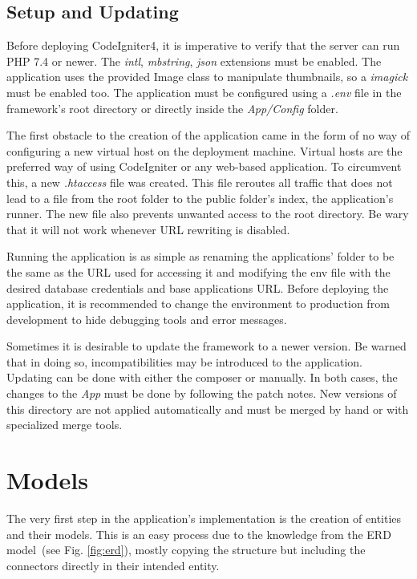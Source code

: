 \documentclass[
  digital,     %
  oneside,     %
  nosansbold,  %
  colorbold, %
  lof,         %
  lot,         %
]{fithesis4}
\newcommand{\imgref}[1]{(see Fig. \ref{fig:#1})}
\begin{document}
\subsection{Setup and Updating}


Before deploying CodeIgniter4, it is imperative to verify that the server can run PHP 7.4 or newer. The
\textit{intl}, \textit{mbstring}, \textit{json} extensions must be enabled. The application uses the
provided Image class to manipulate thumbnails, so a \textit{imagick} must be enabled too. The
application must be configured using a \textit{.env} file in the framework's root directory or directly
inside the \textit{App/Config} folder.

The first obstacle to the creation of the application came in the form of no way of configuring a new
virtual host on the deployment machine. Virtual hosts are the preferred way of using CodeIgniter or
any web-based application. To circumvent this, a new \textit{.htaccess} file was created. This file
reroutes all traffic that does not lead to a file from the root folder to the public folder's index, the
application's runner. The new file also prevents unwanted access to the root directory. Be wary that it
will not work whenever URL rewriting is disabled.

Running the application is as simple as renaming the applications' folder to be the same as the URL
used for accessing it and modifying the env file with the desired database credentials and base
applications URL. Before deploying the application, it is recommended to change the environment to
production from development to hide debugging tools and error messages.

Sometimes it is desirable to update the framework to a newer version. Be warned that in doing so,
incompatibilities may be introduced to the application. Updating can be done with either the
composer or manually. In both cases, the changes to the \textit{App} must be done by following the
patch notes. New versions of this directory are not applied automatically and must be merged by hand
or with specialized merge tools.

\section{Models}

The very first step in the application's implementation is the creation of entities and their models. This
is an easy process due to the knowledge from the ERD model~\imgref{erd}, mostly copying the
structure but including the connectors directly in their intended entity.
\end{document}
